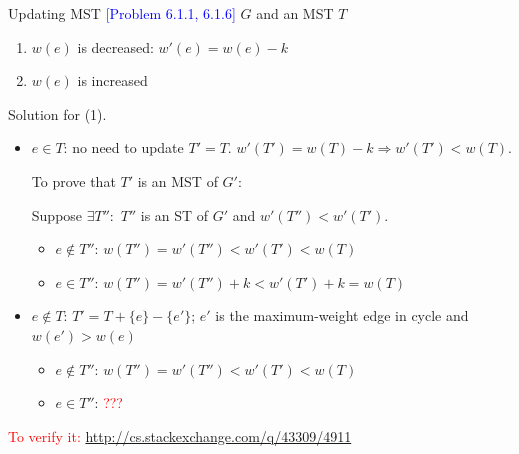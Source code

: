 \documentclass{beamer}
\newcommand{\set}[1]{\{ #1 \}}
\newcommand{\problemno}[1]{\textcolor{blue}{\scriptsize [Problem #1]}}
\begin{document}
\begin{frame}{}
  \begin{block}{Updating MST \problemno{6.1.1, 6.1.6}}
	$G$ and an MST $T$
    \begin{enumerate}
      \item $w(e)$ is decreased: $w'(e) = w(e) - k$
      \item $w(e)$ is increased
    \end{enumerate}
  \end{block}

  \begin{block}{Solution for (1).}
    \begin{itemize}
      \item $e \in T$: no need to update $T' = T$.
      $w'(T') = w(T) - k \Rightarrow w'(T') < w(T)$.

		  To prove that $T'$ is an MST of $G'$:

		  Suppose $\exists T'':$ $T''$ is an ST of $G'$ and
		  $w'(T'') < w'(T')$.
		  \begin{itemize}
		    \item $e \notin T''$: $w(T'') = w'(T'') < w'(T') < w(T)$
		    \item $e \in T''$: $w(T'') = w'(T'') + k < w'(T') + k = w(T)$
		  \end{itemize}
      \item $e \notin T$: $T' = T + \set{e} - \set{e'}$; $e'$ is the
      maximum-weight edge in cycle and $w(e') > w(e)$
		\begin{itemize}
		  \item $e \notin T''$: $w(T'') = w'(T'') < w'(T') < w(T)$
		  \item $e \in T''$: \textcolor{red}{???}
		\end{itemize}
    \end{itemize}
  \end{block}

  \textcolor{red}{To verify it:} \url{http://cs.stackexchange.com/q/43309/4911}
\end{frame}
\end{document}

